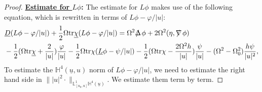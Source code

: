 \documentclass[11pt,reqno]{amsart}
\theoremstyle{definition}
\numberwithin{equation}{section}
\newcommand{\tr}{\mathrm{tr}}
\renewcommand{\L}{\mathbb{L}}
\renewcommand{\H}{\mathbb{H}}
\def\chib{\underline{\chi}}
\def\Lb{\underline{L}}
\def\tr{\mathrm{tr}}
\def\ub{\underline{u}}
\newcommand{\Db}{\underline{D}}
\def\Deltas{\mbox{$\Delta \mkern -13mu /$ }}
\def\ds{\mbox{$\nabla \mkern -13mu /$ }}
\begin{document}
\begin{proof}  {\bf \underline{Estimate for $L\phi$}:} The estimate for $L\phi$ makes use of the following equation, which is rewritten in terms of $L\phi-\varphi/|u|$:
\begin{equation}\label{equ-DbLphi}
\begin{split}
&\Db (L\phi-\varphi/|u|)+\frac{1}{2}\Omega\tr\chib (L\phi-\varphi/|u|)=\Omega^2\Deltas\phi+2\Omega^2(\eta,\ds\phi)\\
&-\frac{1}{2}(\Omega\tr\chib+\frac{2}{|u|})\frac{\varphi}{|u|}-\frac{1}{2}\Omega\tr\chi(\Lb\phi-\psi/|u|)
-\frac{1}{2}(\Omega\tr\chi-\frac{2\Omega^2h}{|u|})\frac{\psi}{|u|}-(\Omega^2-\Omega_0^2)\frac{h\psi}{|u|^2},\\
\end{split}
\end{equation}
To estimate the $\H^4(\ub,u)$ norm of $L\phi-\varphi/|u|$, we need to estimate the right hand side in $\||u|^2\cdot\|_{\L^1_{[u_0,u]}\H^4(\ub)}$. We estimate them term by term.


\end{proof}
\end{document}
